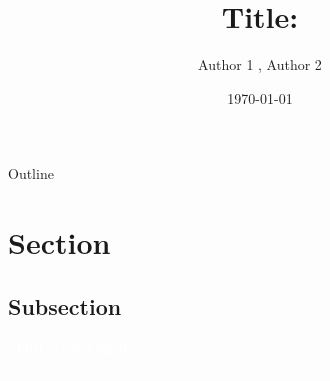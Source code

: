 \documentclass{beamer}
\title{ Title: }
\author{Author 1 , Author 2}
\institute{RSES}
\date{\today}
\begin{document}

\begin{frame}[plain]
  \titlepage
\end{frame}


\begin{frame}{Outline}
	\tableofcontents
\end{frame}

\section{Section}
\subsection{Subsection}


\begin{frame}[plain]
\begin{center}	
	\Large
	\vspace{0.5cm}
	\textcolor{white}{\textbf{``Full screen figure"}\\
	\vspace{0.5cm}
    With text
    }
\end{center}
\end{frame}
\end{document}
